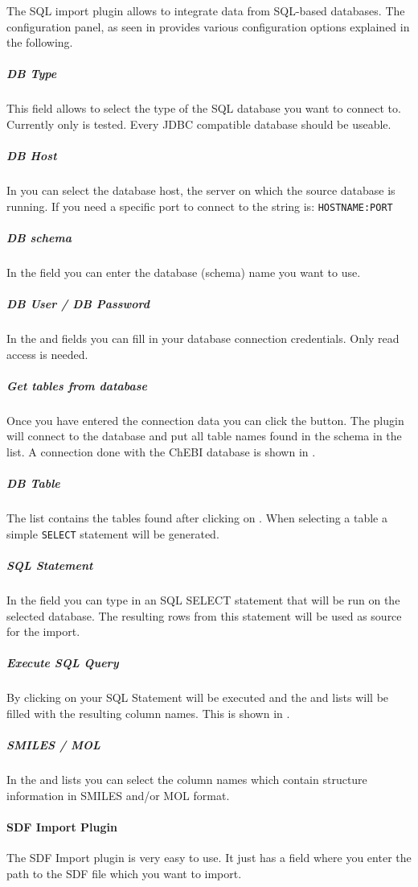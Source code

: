 The SQL import plugin allows to integrate data from SQL-based databases.
The configuration panel, as seen in  provides various configuration options explained in the following.
\subparagraph{DB Type}
This field allows to select the type of the SQL database you want to connect to.
Currently only \mysql is tested. Every JDBC compatible database
should be useable.  %
\subparagraph{DB Host}
In  you can select the database host, the server on which the source
database is running. If you need a specific port to connect to the string is: \verb+HOSTNAME:PORT+
\subparagraph{DB schema}
In the  field you can enter the database (schema) name you want to use.
\subparagraph{DB User / DB Password}
In the  and  fields you can fill in your database connection credentials. Only read access is needed.
\subparagraph{Get tables from database}
Once you have entered the connection data you can click the  button. The plugin will connect to the database and put all table
names found in the schema in the  list. A connection done with the ChEBI database is shown in . 
\subparagraph{DB Table}
The  list contains the tables found after clicking on . When selecting a table a  simple \verb+SELECT+ statement will be generated.
\subparagraph{SQL Statement}
In the  field you can type in an SQL SELECT statement that will be run on the selected database. The resulting rows from this statement will be used as source for the import.
\subparagraph{Execute SQL Query}
By clicking on  your SQL Statement will be executed and the  and  lists will be filled with the resulting column names. This is shown in .
\subparagraph{SMILES / MOL}
In the  and  lists you can select the column names which contain structure information in SMILES and/or MOL format.

\paragraph{SDF Import Plugin}
The SDF Import plugin is very easy to use. It just has a field  where you enter the path to the SDF file which you want to import.

